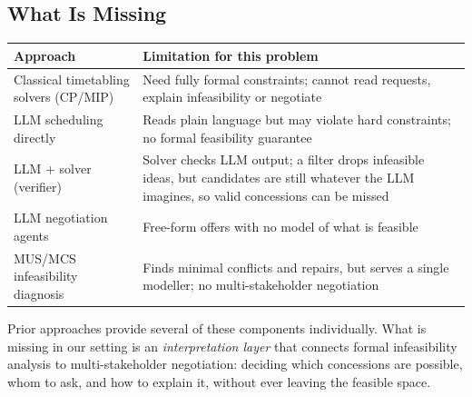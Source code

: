 \documentclass[11pt,a4paper]{article}
\begin{document}
\subsection{What Is Missing}
\begin{table}[!htb]
\centering\small
\begin{tabularx}{\textwidth}{@{}L{4.6cm} Y@{}}
\toprule
\textbf{Approach} & \textbf{Limitation for this problem}\\
\midrule
Classical timetabling solvers (CP/MIP) & Need fully formal constraints; cannot read requests, explain infeasibility or negotiate\\
LLM scheduling directly & Reads plain language but may violate hard constraints; no formal feasibility guarantee\\
LLM + solver (verifier) & Solver checks LLM output; a filter drops infeasible ideas, but candidates are still whatever the LLM imagines, so valid concessions can be missed\\
LLM negotiation agents & Free-form offers with no model of what is feasible\\
MUS/MCS infeasibility diagnosis & Finds minimal conflicts and repairs, but serves a single modeller; no multi-stakeholder negotiation\\
\bottomrule
\end{tabularx}
\end{table}
Prior approaches provide several of these components individually. What is
missing in our setting is an \emph{interpretation layer} that connects formal infeasibility analysis to
multi-stakeholder negotiation: deciding which concessions are possible, whom
to ask, and how to explain it, without ever leaving the feasible space.

\end{document}
